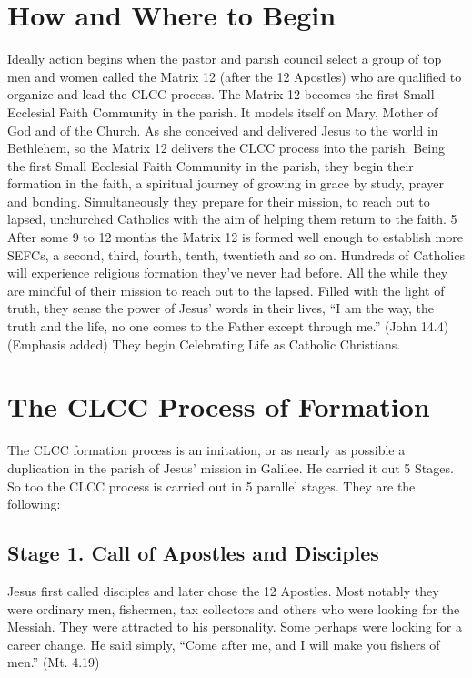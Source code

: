 \documentclass{article}        %
\begin{document}
\section{How and Where to Begin}

Ideally action begins when the pastor and parish council select a group of top
men and women called the Matrix 12 (after the 12 Apostles) who are qualified to
organize and lead the CLCC process. The Matrix 12 becomes the first Small
Ecclesial Faith Community in the parish. It models itself on Mary, Mother of God
and of the Church. As she conceived and delivered Jesus to the world in
Bethlehem, so the Matrix 12 delivers the CLCC process into the parish. Being the
first Small Ecclesial Faith Community in the parish, they begin their formation
in the faith, a spiritual journey of growing in grace by study, prayer and
bonding. Simultaneously they prepare for their mission, to reach out to lapsed,
unchurched Catholics with the aim of helping them return to the faith.
5
After some 9 to 12 months the Matrix 12 is formed well enough to establish more
SEFCs, a second, third, fourth, tenth, twentieth and so on. Hundreds of
Catholics will experience religious formation they've never had before. All the
while they are mindful of their mission to reach out to the lapsed. Filled with
the light of truth, they sense the power of Jesus' words in their lives, ``I am
the way, the truth and the life, no one comes to the Father except through me.''
(John 14.4)(Emphasis added) They begin Celebrating Life as Catholic Christians.

\section{The CLCC Process of Formation}

The CLCC formation process is an imitation, or as nearly as possible a
duplication in the parish of Jesus' mission in Galilee. He carried it out 5
Stages. So too the CLCC process is carried out in 5 parallel stages. They are
the following:

\subsection{Stage 1. Call of Apostles and Disciples}

Jesus first called disciples and later chose the 12 Apostles. Most notably they
were ordinary men, fishermen, tax collectors and others who were looking for the
Messiah. They were attracted to his personality. Some perhaps were looking for a
career change. He said simply, ``Come after me, and I will make you fishers of
men.'' (Mt. 4.19)
\end{document}
